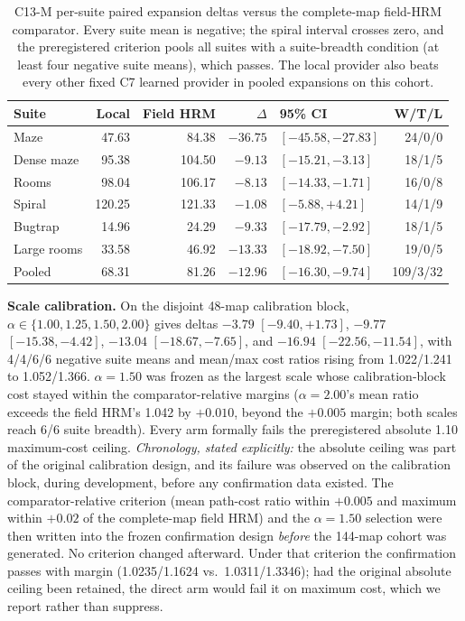 \documentclass[letterpaper]{article} %
\newcommand{\stage}[1]{\textsc{#1}}
\begin{document}
\begin{table}[t]
\centering
\small
\setlength{\tabcolsep}{2.5pt}
\begin{tabular}{@{}lrrrlr@{}}
\toprule
Suite & Local & Field HRM & $\Delta$ & 95\% CI & W/T/L \\
\midrule
Maze & 47.63 & 84.38 & $-36.75$ & $[-45.58,-27.83]$ & 24/0/0 \\
Dense maze & 95.38 & 104.50 & $-9.13$ & $[-15.21,-3.13]$ & 18/1/5 \\
Rooms & 98.04 & 106.17 & $-8.13$ & $[-14.33,-1.71]$ & 16/0/8 \\
Spiral & 120.25 & 121.33 & $-1.08$ & $[-5.88,+4.21]$ & 14/1/9 \\
Bugtrap & 14.96 & 24.29 & $-9.33$ & $[-17.79,-2.92]$ & 18/1/5 \\
Large rooms & 33.58 & 46.92 & $-13.33$ & $[-18.92,-7.50]$ & 19/0/5 \\
\midrule
Pooled & 68.31 & 81.26 & $-12.96$ & $[-16.30,-9.74]$ & 109/3/32 \\
\bottomrule
\end{tabular}
\caption{\stage{C13-M} per-suite paired expansion deltas versus the complete-map field-HRM comparator. Every suite mean is negative; the spiral interval crosses zero, and the preregistered criterion pools all suites with a suite-breadth condition (at least four negative suite means), which passes. The local provider also beats every other fixed \stage{C7} learned provider in pooled expansions on this cohort.}
\label{tab:c13msuite}
\end{table}

\textbf{Scale calibration.} On the disjoint 48-map calibration block, $\alpha\in\{1.00,1.25,1.50,2.00\}$ gives deltas $-3.79$ $[-9.40,+1.73]$, $-9.77$ $[-15.38,-4.42]$, $-13.04$ $[-18.67,-7.65]$, and $-16.94$ $[-22.56,-11.54]$, with 4/4/6/6 negative suite means and mean/max cost ratios rising from 1.022/1.241 to 1.052/1.366. $\alpha{=}1.50$ was frozen as the largest scale whose calibration-block cost stayed within the comparator-relative margins ($\alpha{=}2.00$'s mean ratio exceeds the field HRM's 1.042 by $+0.010$, beyond the $+0.005$ margin; both scales reach 6/6 suite breadth). Every arm formally fails the preregistered absolute 1.10 maximum-cost ceiling. \emph{Chronology, stated explicitly:} the absolute ceiling was part of the original calibration design, and its failure was observed on the calibration block, during development, before any confirmation data existed. The comparator-relative criterion (mean path-cost ratio within $+0.005$ and maximum within $+0.02$ of the complete-map field HRM) and the $\alpha{=}1.50$ selection were then written into the frozen confirmation design \emph{before} the 144-map cohort was generated. No criterion changed afterward. Under that criterion the confirmation passes with margin (1.0235/1.1624 vs.\ 1.0311/1.3346); had the original absolute ceiling been retained, the direct arm would fail it on maximum cost, which we report rather than suppress.
\end{document}
